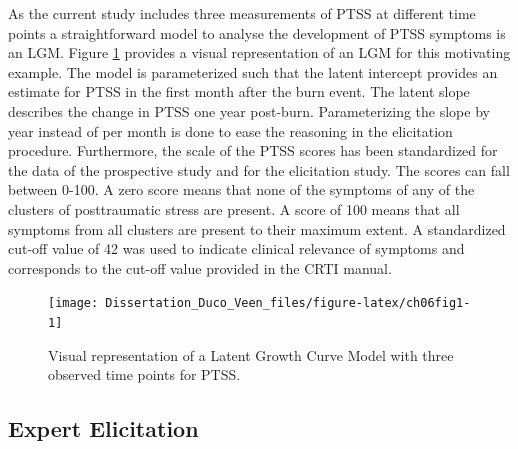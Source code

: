 \documentclass[openright,titlepage,12pt,a4paper]{book}
\begin{document}
As the current study includes three measurements of PTSS at different time points a straightforward model to analyse the development of PTSS symptoms is an LGM. Figure \ref{fig:ch06fig1} provides a visual representation of an LGM for this motivating example. The model is parameterized such that the latent intercept provides an estimate for PTSS in the first month after the burn event. The latent slope describes the change in PTSS one year post-burn. Parameterizing the slope by year instead of per month is done to ease the reasoning in the elicitation procedure. Furthermore, the scale of the PTSS scores has been standardized for the data of the prospective study and for the elicitation study. The scores can fall between 0-100. A zero score means that none of the symptoms of any of the clusters of posttraumatic stress are present. A score of 100 means that all symptoms from all clusters are present to their maximum extent. A standardized cut-off value of 42 was used to indicate clinical relevance of symptoms and corresponds to the cut-off value provided in the CRTI manual.

\begin{figure}

{\centering \texttt{[image: Dissertation\_Duco\_Veen\_files/figure-latex/ch06fig1-1]} 

}

\caption{Visual representation of a Latent Growth Curve Model with three observed time points for PTSS. }\label{fig:ch06fig1}
\end{figure}

\hypertarget{expert-elicitation-1}{%
\subsection{Expert Elicitation}\label{expert-elicitation-1}}
\end{document}
